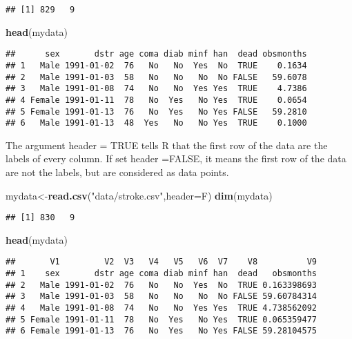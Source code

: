 \documentclass[]{book}
\newenvironment{Shaded}{\begin{snugshade}}{\end{snugshade}}
\newcommand{\KeywordTok}[1]{\textcolor[rgb]{0.13,0.29,0.53}{\textbf{#1}}}
\newcommand{\DataTypeTok}[1]{\textcolor[rgb]{0.13,0.29,0.53}{#1}}
\newcommand{\StringTok}[1]{\textcolor[rgb]{0.31,0.60,0.02}{#1}}
\newcommand{\NormalTok}[1]{#1}
\theoremstyle{definition}
\theoremstyle{definition}
\theoremstyle{definition}
\theoremstyle{remark}
\begin{document}
\begin{verbatim}
## [1] 829   9
\end{verbatim}

\begin{Shaded}
\begin{Highlighting}[]
\KeywordTok{head}\NormalTok{(mydata)}
\end{Highlighting}
\end{Shaded}

\begin{verbatim}
##      sex       dstr age coma diab minf han  dead obsmonths
## 1   Male 1991-01-02  76   No   No  Yes  No  TRUE    0.1634
## 2   Male 1991-01-03  58   No   No   No  No FALSE   59.6078
## 3   Male 1991-01-08  74   No   No  Yes Yes  TRUE    4.7386
## 4 Female 1991-01-11  78   No  Yes   No Yes  TRUE    0.0654
## 5 Female 1991-01-13  76   No  Yes   No Yes FALSE   59.2810
## 6   Male 1991-01-13  48  Yes   No   No Yes  TRUE    0.1000
\end{verbatim}

The argument header = TRUE tells R that the first row of the data are
the labels of every column. If set header =FALSE, it means the first row
of the data are not the labels, but are considered as data points.

\begin{Shaded}
\begin{Highlighting}[]
\NormalTok{mydata<-}\KeywordTok{read.csv}\NormalTok{(}\StringTok{"data/stroke.csv"}\NormalTok{,}\DataTypeTok{header=}\NormalTok{F)}
\KeywordTok{dim}\NormalTok{(mydata)}
\end{Highlighting}
\end{Shaded}

\begin{verbatim}
## [1] 830   9
\end{verbatim}

\begin{Shaded}
\begin{Highlighting}[]
\KeywordTok{head}\NormalTok{(mydata)}
\end{Highlighting}
\end{Shaded}

\begin{verbatim}
##       V1         V2  V3   V4   V5   V6  V7    V8          V9
## 1    sex       dstr age coma diab minf han  dead   obsmonths
## 2   Male 1991-01-02  76   No   No  Yes  No  TRUE 0.163398693
## 3   Male 1991-01-03  58   No   No   No  No FALSE 59.60784314
## 4   Male 1991-01-08  74   No   No  Yes Yes  TRUE 4.738562092
## 5 Female 1991-01-11  78   No  Yes   No Yes  TRUE 0.065359477
## 6 Female 1991-01-13  76   No  Yes   No Yes FALSE 59.28104575
\end{verbatim}
\end{document}
